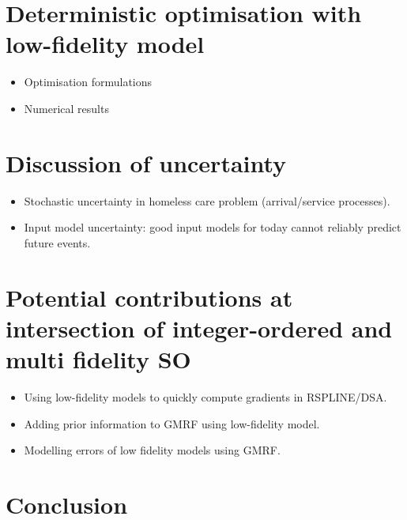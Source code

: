\documentclass{article}
\begin{document}
        
\section{Deterministic optimisation with low-fidelity model} \label{do}

\begin{itemize}[noitemsep]
\item Optimisation formulations
\item Numerical results
\end{itemize}

\section{Discussion of uncertainty} \label{uncert}

\begin{itemize}[noitemsep]
\item Stochastic uncertainty in homeless care problem (arrival/service processes).
\item Input model uncertainty: good input models for today cannot reliably predict future events.
\end{itemize}

\section{Potential contributions at intersection of integer-ordered and multi fidelity SO} \label{mfso}

\begin{itemize}[noitemsep]
\item Using low-fidelity models to quickly compute gradients in RSPLINE/DSA.
\item Adding prior information to GMRF using low-fidelity model.
\item Modelling errors of low fidelity models using GMRF.
\end{itemize}

\section{Conclusion}\label{conc}

\newpage



\end{document}
